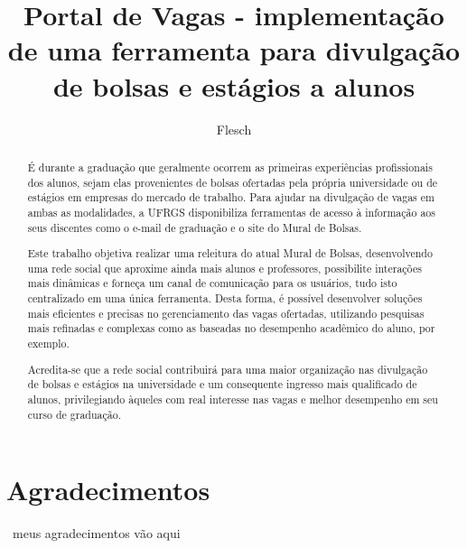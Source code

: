 \documentclass[cic,tc]{iiufrgs}
\title{Portal de Vagas - implementação de uma ferramenta para divulgação de bolsas e estágios a alunos}
\author{Flesch}{Jean Ampos}
\begin{document}
\maketitle


\chapter*{Agradecimentos}
~meus agradecimentos vão aqui~



\begin{abstract}
	É durante a graduação que geralmente ocorrem as primeiras experiências profissionais dos alunos, sejam elas provenientes de bolsas ofertadas pela própria universidade ou de estágios em empresas do mercado de trabalho. Para ajudar na divulgação de vagas em ambas as modalidades, a UFRGS disponibiliza ferramentas de acesso à informação aos seus discentes como o e-mail de graduação e o site do Mural de Bolsas.
    
    Este  trabalho  objetiva realizar  uma  releitura  do atual Mural  de  Bolsas, desenvolvendo  uma rede social que aproxime ainda mais alunos e professores, possibilite interações mais dinâmicas e forneça um canal de comunicação para os usuários, tudo isto centralizado em uma única ferramenta. Desta forma, é possível desenvolver soluções mais eficientes e precisas no gerenciamento das vagas ofertadas, utilizando pesquisas mais refinadas e complexas como as baseadas no desempenho acadêmico do aluno, por exemplo.
    
    Acredita-se que a rede social contribuirá para uma maior organização nas divulgação de bolsas e estágios na universidade e um consequente ingresso mais qualificado de alunos, privilegiando àqueles com real interesse nas vagas e melhor desempenho em seu curso de graduação.
    \newline
\end{abstract}
\end{document}
